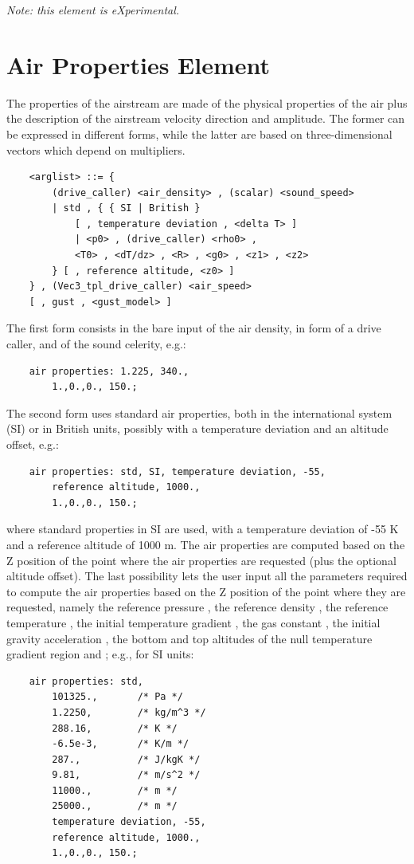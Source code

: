 \noindent
\emph{Note: this element is eXperimental.}




\section{Air Properties Element}\label{sec:EL:AERO:AIRPROPERTIES}
The properties of the airstream are made of the physical properties
of the air plus the description of the airstream velocity direction
and amplitude.
The former can be expressed in different forms, while the latter
are based on three-dimensional vectors which depend on multipliers.
\begin{verbatim}
    <arglist> ::= {
        (drive_caller) <air_density> , (scalar) <sound_speed> 
        | std , { { SI | British }
            [ , temperature deviation , <delta T> ]
            | <p0> , (drive_caller) <rho0> ,
            <T0> , <dT/dz> , <R> , <g0> , <z1> , <z2>
        } [ , reference altitude, <z0> ]
    } , (Vec3_tpl_drive_caller) <air_speed>
    [ , gust , <gust_model> ]
\end{verbatim}
The first form consists in the bare input of the air density,
in form of a drive caller, and of the sound celerity, e.g.:
\begin{verbatim}
    air properties: 1.225, 340.,
        1.,0.,0., 150.;
\end{verbatim}
The second form uses standard air properties, both in the
international system (SI) or in British units, possibly
with a temperature deviation and an altitude offset, e.g.:
\begin{verbatim}
    air properties: std, SI, temperature deviation, -55,
        reference altitude, 1000.,
        1.,0.,0., 150.;
\end{verbatim}
where standard properties in SI are used, with a temperature
deviation of -55 K and a reference altitude of 1000 m.
The air properties are computed based on the Z position of the
point where the air properties are requested (plus the optional
altitude offset).
The last possibility lets the user input all the parameters
required to compute the air properties based on the Z position
of the point where they are requested, namely the reference
pressure , the reference density ,
the reference temperature , the initial temperature
gradient , the gas constant , the
initial gravity acceleration , the bottom and top
altitudes of the null temperature gradient region  and
; e.g., for SI units:
\begin{verbatim}
    air properties: std,
        101325.,       /* Pa */
        1.2250,        /* kg/m^3 */
        288.16,        /* K */
        -6.5e-3,       /* K/m */
        287.,          /* J/kgK */
        9.81,          /* m/s^2 */
        11000.,        /* m */
        25000.,        /* m */
        temperature deviation, -55,
        reference altitude, 1000.,
        1.,0.,0., 150.;
\end{verbatim}
